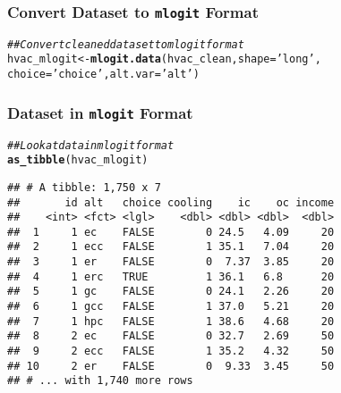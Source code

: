 \documentclass{beamer}\usepackage[]{graphicx}\usepackage[]{color}
\makeatletter
\newcommand{\hlstr}[1]{\textcolor[rgb]{0.192,0.494,0.8}{#1}}%
\newcommand{\hlcom}[1]{\textcolor[rgb]{0.678,0.584,0.686}{\textit{#1}}}%
\newcommand{\hlstd}[1]{\textcolor[rgb]{0.345,0.345,0.345}{#1}}%
\newcommand{\hlkwb}[1]{\textcolor[rgb]{0.69,0.353,0.396}{#1}}%
\newcommand{\hlkwc}[1]{\textcolor[rgb]{0.333,0.667,0.333}{#1}}%
\newcommand{\hlkwd}[1]{\textcolor[rgb]{0.737,0.353,0.396}{\textbf{#1}}}%
\newenvironment{kframe}{%
 \def\at@end@of@kframe{}%
 \ifinner\ifhmode%
  \def\at@end@of@kframe{\end{minipage}}%
  \begin{minipage}{\columnwidth}%
 \fi\fi%
 \def\FrameCommand##1{\hskip\@totalleftmargin \hskip-\fboxsep
 \colorbox{shadecolor}{##1}\hskip-\fboxsep
     \hskip-\linewidth \hskip-\@totalleftmargin \hskip\columnwidth}%
 \MakeFramed {\advance\hsize-\width
   \@totalleftmargin\z@ \linewidth\hsize
   \@setminipage}}%
 {\par\unskip\endMakeFramed%
 \at@end@of@kframe}
\newenvironment{knitrout}{}{} %
\makeatother
\begin{document}
\begin{frame}[fragile]\frametitle{Convert Dataset to \texttt{mlogit} Format}
\begin{knitrout}\footnotesize
{}\color{fgcolor}\begin{kframe}
\begin{alltt}
\hlcom{## Convert cleaned dataset to mlogit format}
\hlstd{hvac_mlogit} \hlkwb{<-} \hlkwd{mlogit.data}\hlstd{(hvac_clean,} \hlkwc{shape} \hlstd{=} \hlstr{'long'}\hlstd{,}
                           \hlkwc{choice} \hlstd{=} \hlstr{'choice'}\hlstd{,} \hlkwc{alt.var} \hlstd{=} \hlstr{'alt'}\hlstd{)}
\end{alltt}
\end{kframe}
\end{knitrout}
\end{frame}

\begin{frame}[fragile]\frametitle{Dataset in \texttt{mlogit} Format}
\begin{knitrout}\footnotesize
{}\color{fgcolor}\begin{kframe}
\begin{alltt}
\hlcom{## Look at data in mlogit format}
\hlkwd{as_tibble}\hlstd{(hvac_mlogit)}
\end{alltt}
\begin{verbatim}
## # A tibble: 1,750 x 7
##       id alt   choice cooling    ic    oc income
##    <int> <fct> <lgl>    <dbl> <dbl> <dbl>  <dbl>
##  1     1 ec    FALSE        0 24.5   4.09     20
##  2     1 ecc   FALSE        1 35.1   7.04     20
##  3     1 er    FALSE        0  7.37  3.85     20
##  4     1 erc   TRUE         1 36.1   6.8      20
##  5     1 gc    FALSE        0 24.1   2.26     20
##  6     1 gcc   FALSE        1 37.0   5.21     20
##  7     1 hpc   FALSE        1 38.6   4.68     20
##  8     2 ec    FALSE        0 32.7   2.69     50
##  9     2 ecc   FALSE        1 35.2   4.32     50
## 10     2 er    FALSE        0  9.33  3.45     50
## # ... with 1,740 more rows
\end{verbatim}
\end{kframe}
\end{knitrout}
\end{frame}
\end{document}
